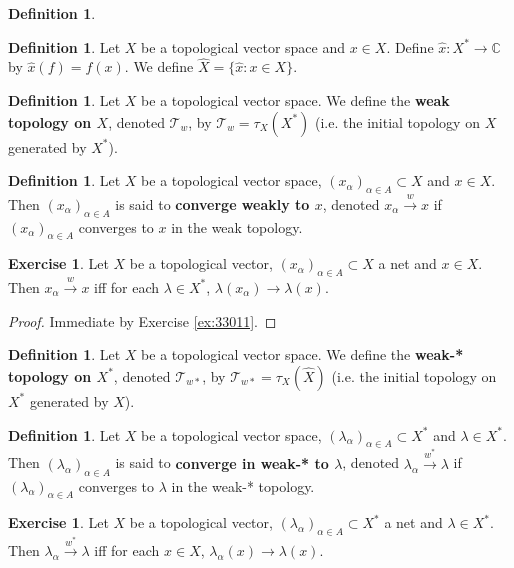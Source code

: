 \documentclass[12pt]{amsart}
\theoremstyle{definition}
\newtheorem{defn}[definition]{Definition}
\newtheorem{ex}[definition]{Exercise}
\newcommand{\al}{\alpha}
\newcommand{\lam}{\lambda}
\newcommand{\C}{\mathbb{C}}
\newcommand{\MT}{\mathcal{T}}
\newcommand{\tbf}[1]{\textbf{#1}}
\newcommand{\conv}[1]{\xrightarrow{#1}}
\DeclareMathOperator*{\0}{\mbf{0}}
\DeclareMathOperator*{\1}{\mbf{1}}
\newcommand{\lex}[1]{\label{ex:#1}}
\newcommand{\rex}[1]{Exercise \ref{ex:#1}}
\begin{document}
	\begin{defn}
		
	\end{defn}
	
	\begin{defn}
		Let $X$ be a topological vector space and $x \in X$. Define $\hat{x}:X^* \rightarrow \C$ by $\hat{x}(f) = f(x)$. We define $\hat{X} = \{\hat{x}: x \in X\}$.
	\end{defn}

	\begin{defn}
		Let $X$ be a topological vector space. We define the \tbf{weak topology on $X$}, denoted $\MT_w$, by $\MT_w = \tau_X(X^*)$ (i.e. the initial topology on $X$ generated by $X^*$).
	\end{defn}

	\begin{defn}
		Let $X$ be a topological vector space, $(x_{\al})_{\al \in A} \subset X$ and $x \in X$. Then $(x_{\al})_{\al \in A}$ is said to \tbf{converge weakly to $x$}, denoted $x_{\al} \conv{w} x$ if $(x_{\al})_{\al \in A}$ converges to $x$ in the weak topology.
	\end{defn}
	
	\begin{ex} \lex{}
		Let $X$ be a topological vector, $(x_{\al})_{\al \in A} \subset X$ a net and $x \in X$. Then $x_{\al} \conv{w} x$ iff for each $\lam \in X^*$, $ \lam (x_{\al}) \rightarrow \lam(x)$. 
	\end{ex}
	
	\begin{proof}
		Immediate by \rex{33011}.
	\end{proof}
	
	\begin{defn}
		Let $X$ be a topological vector space. We define the \tbf{weak-* topology on $X^*$}, denoted $\MT_{w*}$, by $\MT_{w*} = \tau_X(\hat{X})$ (i.e. the initial topology on $X^*$ generated by $\hat{X}$). 
	\end{defn}
	
	\begin{defn}
		Let $X$ be a topological vector space, $(\lam_{\al})_{\al \in A} \subset X^*$ and $\lam \in X^*$. Then $(\lam_{\al})_{\al \in A}$ is said to \tbf{converge in weak-* to $\lam$}, denoted $\lam_{\al} \conv{w^*} \lam$ if $(\lam_{\al})_{\al \in A}$ converges to $\lam$ in the weak-* topology.
	\end{defn}
	
	\begin{ex} \lex{}
		Let $X$ be a topological vector, $(\lam_{\al})_{\al \in A} \subset X^*$ a net and $\lam \in X^*$. Then $\lam_{\al} \conv{w^*} \lam$ iff for each $x \in X$, $ \lam_{\al} (x) \rightarrow \lam(x)$. 
	\end{ex}
	
\end{document}
